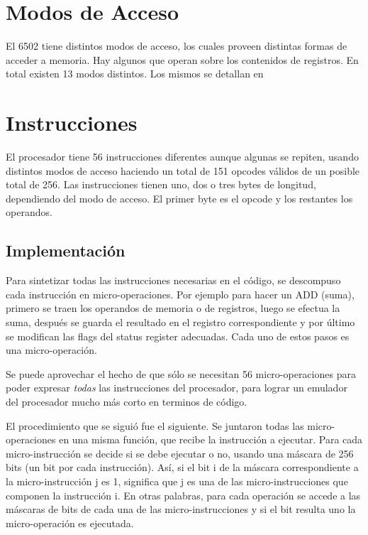 \section{Modos de Acceso}
El 6502 tiene distintos modos de acceso, los cuales proveen distintas formas de acceder a memoria. Hay algunos que operan sobre los contenidos de registros. En total existen 13 modos distintos. Los mismos se detallan en \cite[p.~39]{nesdoc}
\section{Instrucciones}

El procesador tiene 56 instrucciones diferentes aunque algunas se repiten, usando distintos modos de acceso haciendo un total de 151 opcodes válidos de un posible total de 256. Las instrucciones tienen uno, dos o tres bytes de longitud, dependiendo del modo de acceso. El primer byte es el opcode y los restantes los operandos.

\subsection{Implementación}

Para sintetizar todas las instrucciones necesarias en el código, se descompuso cada instrucción en micro-operaciones. Por ejemplo para hacer un ADD (suma), primero se traen los operandos de memoria o de registros, luego se efectua la suma, después se guarda el resultado en el registro correspondiente y por último se modifican las flags del status register adecuadas. Cada uno de estos pasos es una micro-operación.

Se puede aprovechar el hecho de que sólo se necesitan 56 micro-operaciones para poder expresar \emph{todas} las instrucciones del procesador, para lograr un emulador del procesador mucho más corto en terminos de código.

El procedimiento que se siguió fue el siguiente. Se juntaron todas las micro-operaciones en una misma función, que recibe la instrucción a ejecutar. Para cada micro-instrucción se decide si se debe ejecutar o no, usando una máscara de 256 bits (un bit por cada instrucción). Así, si el bit i de la máscara correspondiente a la micro-instrucción j es 1, significa que j es una de las micro-instrucciones que componen la instrucción i.
En otras palabras, para cada operación se accede a las máscaras de bits de cada una de las micro-instrucciones y si el bit resulta uno la micro-operación es ejecutada.

